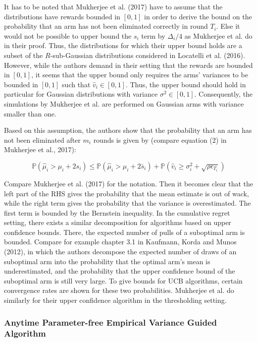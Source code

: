 \documentclass[11pt,]{article}
\begin{document}
It has to be noted that Mukherjee et al. (2017) have to assume that the
distributions have rewards bounded in \([0,1]\) in order to derive the
bound on the probability that an arm has not been eliminated correctly
in round \(T_i\). Else it would not be possible to upper bound the
\(s_i\) term by \(\Delta_i/4\) as Mukherjee et al. do in their proof.
Thus, the distributions for which their upper bound holds are a subset
of the \(R\)-sub-Gaussian distributions considered in Locatelli et al.
(2016). However, while the authors demand in their setting that the
rewards are bounded in \([0,1]\), it seems that the upper bound only
requires the arms' variances to be bounded in \([0,1]\) such that
\(\hat{v}_i \in [0,1]\). Thus, the upper bound should hold in particular
for Gaussian distributions with variance \(\sigma^2 \in [0,1]\).
Consequently, the simulations by Mukherjee et al. are performed on
Gaussian arms with variance smaller than one.

Based on this assumption, the authors show that the probability that an
arm has not been eliminated after \(m_i\) rounds is given by (compare
equation (2) in Mukherjee et al., 2017):

\begin{equation} \label{Mukherjee2017Equation2}
\mathbb{P}(\hat{\mu}_i > \mu_i + 2s_i) \leq \mathbb{P} (\hat{\mu}_i > \mu_i + 2\bar{s}_i) + \mathbb{P}(\hat{v}_i \geq \sigma^2_i + \sqrt{\rho \epsilon_{T_i}})
\end{equation}

Compare Mukherjee et al. (2017) for the notation. Then it becomes clear
that the left part of the RHS gives the probability that the mean
estimate is out of wack, while the right term gives the probability that
the variance is overestimated. The first term is bounded by the
Bernstein inequality. In the cumulative regret setting, there exists a
similar decomposition for algorithms based on upper confidence bounds.
There, the expected number of pulls of a suboptimal arm is bounded.
Compare for example chapter 3.1 in Kaufmann, Korda and Munos (2012), in
which the authors decompose the expected number of draws of an
suboptimal arm into the probability that the optimal arm's mean is
underestimated, and the probability that the upper confidence bound of
the suboptimal arm is still very large. To give bounds for UCB
algorithms, certain convergence rates are shown for these two
probabilities. Mukherjee et al. do similarly for their upper confidence
algorithm in the thresholding setting.

\subsubsection{\texorpdfstring{Anytime Parameter-free Empirical Variance
Guided Algorithm
\label{sec:EVTAlgorithm}}{Anytime Parameter-free Empirical Variance Guided Algorithm }}\label{anytime-parameter-free-empirical-variance-guided-algorithm}
\end{document}
